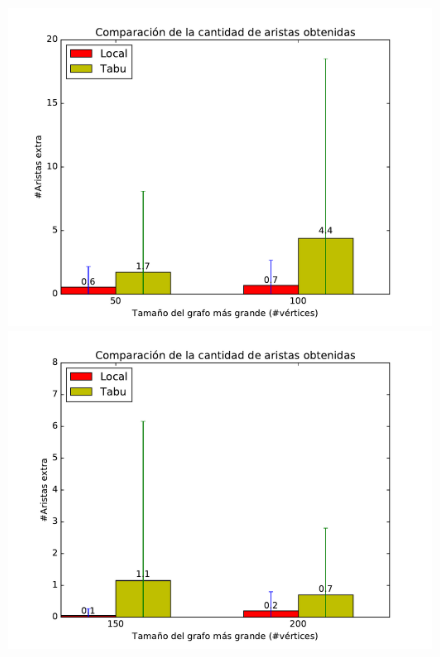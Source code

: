 \begin{figure}[H]
\centering
\begin{minipage}{0.49\textwidth}
  \centering
    \includegraphics[width=1\textwidth]{graficos/problema_7/calidad0.pdf}
  \caption{}
  \label{fig:7-calidad1}
\end{minipage}%
\hspace{0.01\textwidth}
\begin{minipage}{0.49\textwidth}   
  \centering
    \includegraphics[width=1\textwidth]{graficos/problema_7/calidad2.pdf} 
  \caption{}
  \label{fig:7-calidad2}
\end{minipage}


\end{figure}
